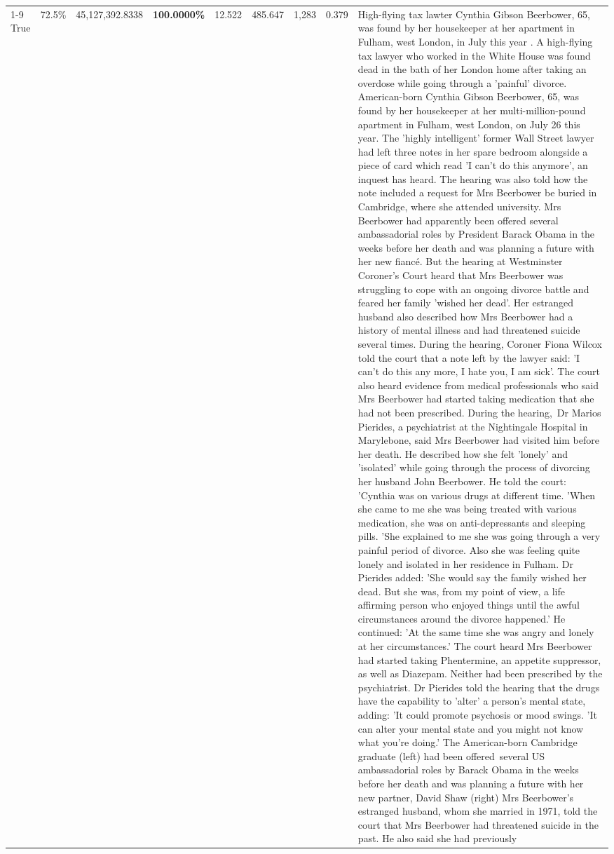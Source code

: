 \begin{table}[H]
\begin{tabular}{lllrlllll}
\cline{1-9}
True & 72.5\% & 45,127,392.8338 & \bfseries \color{red} 100.0000\% & 12.522 & 485.647 & 1,283 & 0.379 & High-flying tax lawter Cynthia Gibson Beerbower, 65, was found by her housekeeper at her apartment in Fulham, west London, in July this year . A high-flying tax lawyer who worked in the White House was found dead in the bath of her London home after taking an overdose while going through a 'painful' divorce. American-born Cynthia Gibson Beerbower, 65, was found by her housekeeper at her multi-million-pound apartment in Fulham, west London, on July 26 this year. The 'highly intelligent' former Wall Street lawyer had left three notes in her spare bedroom alongside a piece of card which read 'I can't do this anymore', an inquest has heard. The hearing was also told how the note included a request for Mrs Beerbower be buried in Cambridge, where she attended university. Mrs Beerbower had apparently been offered several ambassadorial roles by President Barack Obama in the weeks before her death and was planning a future with her new fiancé. But the hearing at Westminster Coroner's Court heard that Mrs Beerbower was struggling to cope with an ongoing divorce battle and feared her family 'wished her dead'. Her estranged husband also described how Mrs Beerbower had a history of mental illness and had threatened suicide several times. During the hearing, Coroner Fiona Wilcox told the court that a note left by the lawyer said: 'I can't do this any more, I hate you, I am sick'. The court also heard evidence from medical professionals who said Mrs Beerbower had started taking medication that she had not been prescribed. During the hearing, Dr Marios Pierides, a psychiatrist at the Nightingale Hospital in Marylebone, said Mrs Beerbower had visited him before her death. He described how she felt 'lonely' and 'isolated' while going through the process of divorcing her husband John Beerbower. He told the court: 'Cynthia was on various drugs at different time. 'When she came to me she was being treated with various medication, she was on anti-depressants and sleeping pills. 'She explained to me she was going through a very painful period of divorce. Also she was feeling quite lonely and isolated in her residence in Fulham. Dr Pierides added: 'She would say the family wished her dead. But she was, from my point of view, a life affirming person who enjoyed things until the awful circumstances around the divorce happened.' He continued: 'At the same time she was angry and lonely at her circumstances.' The court heard Mrs Beerbower had started taking Phentermine, an appetite suppressor, as well as Diazepam. Neither had been prescribed by the psychiatrist. Dr Pierides told the hearing that the drugs have the capability to 'alter' a person's mental state, adding: 'It could promote psychosis or mood swings. 'It can alter your mental state and you might not know what you're doing.' The American-born Cambridge graduate (left) had been offered several US ambassadorial roles by Barack Obama in the weeks before her death and was planning a future with her new partner, David Shaw (right) Mrs Beerbower's estranged husband, whom she married in 1971, told the court that Mrs Beerbower had threatened suicide in the past. He also said she had previously 
\end{tabular}
\end{table}
